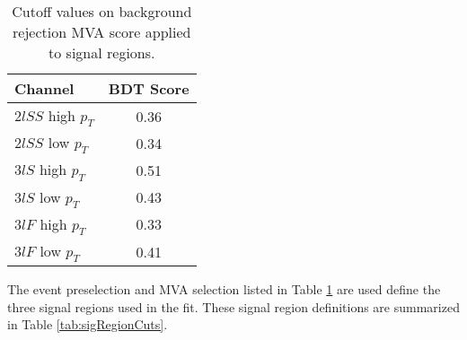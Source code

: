 \begin{table}[H]
  \begin{center}
  \begin{tabular}{l|c}
  \hline\hline
  Channel & BDT Score \\
  \hline
  $2lSS$ high $p_T$ & 0.36 \\
  $2lSS$ low $p_T$ & 0.34 \\
  $3lS$ high $p_T$ & 0.51 \\
  $3lS$ low $p_T$ & 0.43 \\
  $3lF$ high $p_T$ & 0.33 \\
  $3lF$ low $p_T$ & 0.41 \\
  \hline
  \end{tabular}
  \end{center}
  \caption{Cutoff values on background rejection MVA score applied to signal regions.}
  \label{tab:sigBkgCuts}
\end{table}

The event preselection and MVA selection listed in Table \ref{tab:sigBkgCuts} are used define the three signal regions used in the fit. These signal region definitions are summarized in Table \ref{tab:sigRegionCuts}.

